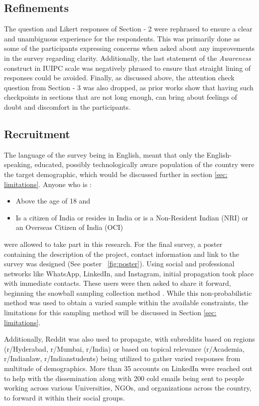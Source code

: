 \subsection{Refinements} \label{subsec: refinements}
The question and Likert responses of Section - 2 were rephrased to ensure a clear and unambiguous experience for the respondents. This was primarily done as some of the participants expressing concerns when asked about any improvements in the survey regarding clarity. Additionally, the last statement of the \textit{Awareness} construct in IUIPC scale was negatively phrased to ensure that straight lining of responses could be avoided. Finally, as discussed above, the attention check question from Section - 3 was also dropped, as prior works show that having such checkpoints in sections that are not long enough, can bring about feelings of doubt and discomfort in the participants. 


\subsection{Recruitment} \label{Subsec: recruiting}

The language of the survey being in English, meant that only the English-speaking, educated, possibly technologically aware population of the country were the target demographic, which would be discussed further in section \ref{sec: limitations}.
Anyone who is :
\begin{itemize}
    \item Above the age of 18 and
    \item Is a citizen of India or resides in India or is a Non-Resident Indian (NRI) or an Overseas Citizen of India (OCI) 
\end{itemize}
were allowed to take part in this research. For the final survey, a poster containing the description of the project, contact information and link to the survey was designed (See poster ~\ref{fig:poster}). Using social and professional networks like WhatsApp, LinkedIn, and Instagram, initial propagation took place with immediate contacts. These users were then asked to share it forward, beginning the snowball sampling collection method \cite{parker2019snowball}. While this non-probabilistic method was used to obtain a varied sample within the available constraints, the limitations for this sampling method will be discussed in Section \ref{sec: limitations}. 

Additionally, Reddit was also used to propagate, with subreddits based on regions (r/Hyderabad, r/Mumbai, r/India) or based on topical relevance (r/Academia, r/Indianlaw, r/Indianstudents) being utilized to gather varied responses from multitude of demographics. More than 35 accounts on LinkedIn were reached out to help with the dissemination along with 200 cold emails being sent to people working across various Universities, NGOs, and organizations across the country, to forward it within their social groups. 

